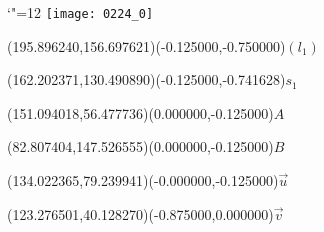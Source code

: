 \documentclass[12pt]{article}
\begin{document}
\makeatletter%
\let\ASYencoding\f@encoding%
\let\ASYfamily\f@family%
\let\ASYseries\f@series%
\let\ASYshape\f@shape%
\makeatother%
{\catcode`"=12%
\texttt{[image: 0224\_0]}%
}%
\kern -228.123922pt%
%
%
\fontsize{12.000000}{14.400000}\selectfont%
\usefont{\ASYencoding}{\ASYfamily}{\ASYseries}{\ASYshape}%
\ASYalign(195.896240,156.697621)(-0.125000,-0.750000){$(l_1)$}%
%
%
\fontsize{12.000000}{14.400000}\selectfont%
\ASYalign(162.202371,130.490890)(-0.125000,-0.741628){$s_1$}%
%
%
\fontsize{12.000000}{14.400000}\selectfont%
\ASYalign(151.094018,56.477736)(0.000000,-0.125000){$A$}%
%
%
\fontsize{12.000000}{14.400000}\selectfont%
\ASYalign(82.807404,147.526555)(0.000000,-0.125000){$B$}%
%
%
\fontsize{12.000000}{14.400000}\selectfont%
\ASYalign(134.022365,79.239941)(-0.000000,-0.125000){$\vec{u}$}%
%
%
\fontsize{12.000000}{14.400000}\selectfont%
\ASYalign(123.276501,40.128270)(-0.875000,0.000000){$\vec{v}$}%
\end{document}
